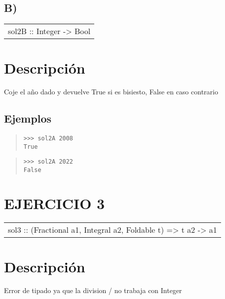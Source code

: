 \subsection{B)}
\begin{haddockdesc}
\item[\begin{tabular}{@{}l}
sol2B :: Integer -> Bool
\end{tabular}]
{\haddockbegindoc
\section*{Descripción}
Coje el año dado y devuelve True si es bisiesto, False en caso contrario\par
\subsection*{Ejemplos}
\begin{quote}
{\haddockverb\begin{verbatim}
>>> sol2A 2008
True

\end{verbatim}}
\end{quote}
\begin{quote}
{\haddockverb\begin{verbatim}
>>> sol2A 2022
False

\end{verbatim}}
\end{quote}}
\end{haddockdesc}
\section{EJERCICIO 3}
\begin{haddockdesc}
\item[\begin{tabular}{@{}l}
sol3 :: (Fractional a1, Integral a2, Foldable t) => t a2 -> a1
\end{tabular}]
{\haddockbegindoc
\section*{Descripción}
Error de tipado ya que la division / no trabaja con Integer\par}
\end{haddockdesc}
